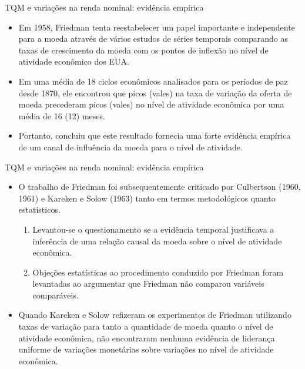 \documentclass[10pt]{beamer}
\begin{document}
\begin{frame}{TQM e variações na renda nominal: evidência empírica}
    \begin{itemize}
        \item Em 1958, Friedman tenta reestabelecer um papel importante e independente para a moeda através de vários estudos de séries temporais comparando as taxas de crescimento da moeda com os pontos de inflexão no nível de atividade econômico dos EUA.
        \bigskip
        \item Em uma média de 18 ciclos econômicos analisados para os períodos de paz desde 1870, ele encontrou que picos (vales) na taxa de variação da oferta de moeda precederam picos (vales) no nível de atividade econômica por uma média de 16 (12) meses.
        \bigskip
        \item Portanto, concluiu que este resultado fornecia uma forte evidência empírica de um canal de influência da moeda para o nível de atividade.
    \end{itemize}
\end{frame}

\begin{frame}{TQM e variações na renda nominal: evidência empírica}
    \begin{itemize}
        \item O trabalho de Friedman foi subsequentemente criticado por Culbertson (1960, 1961) e Kareken e Solow (1963) tanto em termos metodológicos quanto estatísticos.
        \bigskip
        \begin{enumerate}
            \item Levantou-se o questionamento se a evidência temporal justificava a inferência de uma relação causal da moeda sobre o nível de atividade econômica.
            \bigskip
            \item Objeções estatísticas ao procedimento conduzido por Friedman foram levantadas ao argumentar que Friedman não comparou variáveis comparáveis.
        \end{enumerate}
        \bigskip
        \item Quando Kareken e Solow refizeram os experimentos de Friedman utilizando taxas de variação para tanto a quantidade de moeda quanto o nível de atividade econômica, não encontraram nenhuma evidência de liderança uniforme de variações monetárias sobre variações no nível de atividade econômica.
    \end{itemize}
\end{frame}
\end{document}
